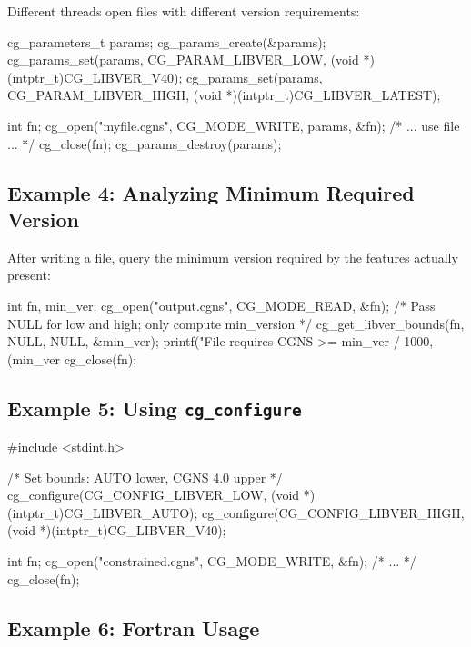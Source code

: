\documentclass[11pt,letterpaper]{article}
\makeatletter
\let\cgns@orig@lstlisting\lstlisting
\let\cgns@endorig@lstlisting\endlstlisting
\renewenvironment{lstlisting}
  {\par\needspace{5\baselineskip}\nolinenumbers\cgns@orig@lstlisting}
  {\cgns@endorig@lstlisting\par\linenumbers}
\makeatother
\begin{document}
Different threads open files with different version requirements:

\begin{lstlisting}[language=C]
cg_parameters_t params;
cg_params_create(&params);
cg_params_set(params, CG_PARAM_LIBVER_LOW,
              (void *)(intptr_t)CG_LIBVER_V40);
cg_params_set(params, CG_PARAM_LIBVER_HIGH,
              (void *)(intptr_t)CG_LIBVER_LATEST);

int fn;
cg_open("myfile.cgns", CG_MODE_WRITE, params, &fn);
/* ... use file ... */
cg_close(fn);
cg_params_destroy(params);
\end{lstlisting}

\subsection{Example 4: Analyzing Minimum Required Version}

After writing a file, query the minimum version required by the
features actually present:

\begin{lstlisting}[language=C]
int fn, min_ver;
cg_open("output.cgns", CG_MODE_READ, &fn);
/* Pass NULL for low and high; only compute min_version */
cg_get_libver_bounds(fn, NULL, NULL, &min_ver);
printf("File requires CGNS >= %d.%d\n",
       min_ver / 1000, (min_ver % 1000) / 10);
cg_close(fn);
\end{lstlisting}

\subsection{Example 5: Using \texttt{cg\_configure}}

\begin{lstlisting}[language=C]
#include <stdint.h>

/* Set bounds: AUTO lower, CGNS 4.0 upper */
cg_configure(CG_CONFIG_LIBVER_LOW,
             (void *)(intptr_t)CG_LIBVER_AUTO);
cg_configure(CG_CONFIG_LIBVER_HIGH,
             (void *)(intptr_t)CG_LIBVER_V40);

int fn;
cg_open("constrained.cgns", CG_MODE_WRITE, &fn);
/* ... */
cg_close(fn);
\end{lstlisting}

\subsection{Example 6: Fortran Usage}
\end{document}
